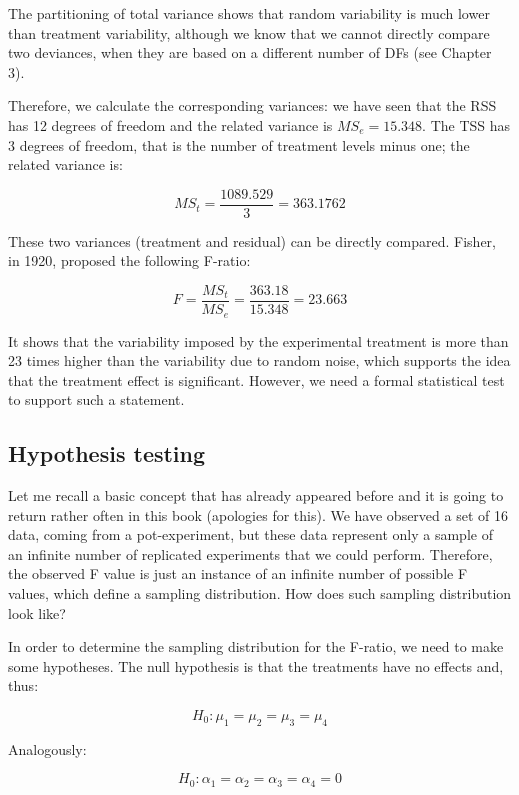 \documentclass[a4paper,12pt,oneside]{book}
\begin{document}
The partitioning of total variance shows that random variability is much lower than treatment variability, although we know that we cannot directly compare two deviances, when they are based on a different number of DFs (see Chapter 3).

Therefore, we calculate the corresponding variances: we have seen that the RSS has 12 degrees of freedom and the related variance is \(MS_e = 15.348\). The TSS has 3 degrees of freedom, that is the number of treatment levels minus one; the related variance is:

\[MS_t = \frac{1089.529}{3} = 363.1762\]

These two variances (treatment and residual) can be directly compared. Fisher, in 1920, proposed the following F-ratio:

\[F = \frac{MS_t}{MS_e} = \frac{363.18}{15.348} = 23.663\]

It shows that the variability imposed by the experimental treatment is more than 23 times higher than the variability due to random noise, which supports the idea that the treatment effect is significant. However, we need a formal statistical test to support such a statement.

\hypertarget{hypothesis-testing}{%
\subsection{Hypothesis testing}\label{hypothesis-testing}}

Let me recall a basic concept that has already appeared before and it is going to return rather often in this book (apologies for this). We have observed a set of 16 data, coming from a pot-experiment, but these data represent only a sample of an infinite number of replicated experiments that we could perform. Therefore, the observed F value is just an instance of an infinite number of possible F values, which define a sampling distribution. How does such sampling distribution look like?

In order to determine the sampling distribution for the F-ratio, we need to make some hypotheses. The null hypothesis is that the treatments have no effects and, thus:

\[H_0: \mu_1 = \mu_2 = \mu_3 = \mu_4\]

Analogously:

\[H_0: \alpha_1 = \alpha_2 = \alpha_3 = \alpha_4 = 0\]
\end{document}

